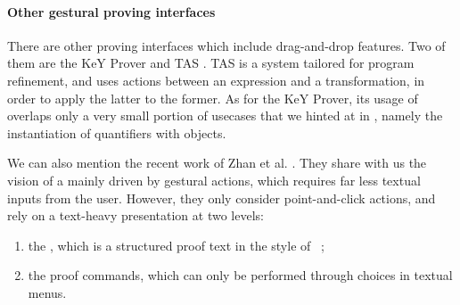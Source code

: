 \begin{scope}
\paragraph{Other gestural proving interfaces}

There are other proving interfaces which include drag-and-drop features. Two of
them are the KeY Prover  and TAS
. TAS is a  system tailored for program
refinement, and uses  actions between an expression and a transformation, in
order to apply the latter to the former.
As for the KeY Prover, its usage of  overlaps only a very small portion
of usecases that we hinted at in , namely the instantiation of
quantifiers with objects.

We can also mention the recent work of Zhan et al. .
They share with us the vision of a  mainly driven by gestural
actions, which requires far less textual inputs from the user. However, they
only consider point-and-click actions, and rely on a text-heavy presentation at
two levels:
\begin{enumerate}
  \item the , which is a structured proof text in the style of
  ~;
  \item the proof commands, which can only be performed through choices in
  textual menus.
\end{enumerate}




\end{scope}
